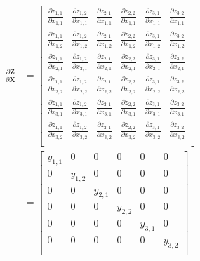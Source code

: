 \documentclass{article}
\newcommand{\matr}[1]{\mathbf{#1}} %
\begin{document}
\begin{align}
\frac{\partial \matr{Z}}{\partial \matr{X}} &=
\begin{bmatrix}
\frac{\partial z_{1,1}}{\partial x_{1,1}} & \frac{\partial z_{1,2}}{\partial x_{1,1}} & \frac{\partial z_{2,1}}{\partial x_{1,1}} & \frac{\partial z_{2,2}}{\partial x_{1,1}} & \frac{\partial z_{3,1}}{\partial x_{1,1}} & \frac{\partial z_{3,2}}{\partial x_{1,1}}\\[0.7em]
\frac{\partial z_{1,1}}{\partial x_{1,2}} & \frac{\partial z_{1,2}}{\partial x_{1,2}} & \frac{\partial z_{2,1}}{\partial x_{1,2}} & \frac{\partial z_{2,2}}{\partial x_{1,2}} & \frac{\partial z_{3,1}}{\partial x_{1,2}} & \frac{\partial z_{3,2}}{\partial x_{1,2}}\\[0.7em]
\frac{\partial z_{1,1}}{\partial x_{2,1}} & \frac{\partial z_{1,2}}{\partial x_{2,1}} & \frac{\partial z_{2,1}}{\partial x_{2,1}} & \frac{\partial z_{2,2}}{\partial x_{2,1}} & \frac{\partial z_{3,1}}{\partial x_{2,1}} & \frac{\partial z_{3,2}}{\partial x_{2,1}}\\[0.7em]
\frac{\partial z_{1,1}}{\partial x_{2,2}} & \frac{\partial z_{1,2}}{\partial x_{2,2}} & \frac{\partial z_{2,1}}{\partial x_{2,2}} & \frac{\partial z_{2,2}}{\partial x_{2,2}} & \frac{\partial z_{3,1}}{\partial x_{2,2}} & \frac{\partial z_{3,2}}{\partial x_{2,2}}\\[0.7em]
\frac{\partial z_{1,1}}{\partial x_{3,1}} & \frac{\partial z_{1,2}}{\partial x_{3,1}} & \frac{\partial z_{2,1}}{\partial x_{3,1}} & \frac{\partial z_{2,2}}{\partial x_{3,1}} & \frac{\partial z_{3,1}}{\partial x_{3,1}} & \frac{\partial z_{3,2}}{\partial x_{3,1}}\\[0.7em]
\frac{\partial z_{1,1}}{\partial x_{3,2}} & \frac{\partial z_{1,2}}{\partial x_{3,2}} & \frac{\partial z_{2,1}}{\partial x_{3,2}} & \frac{\partial z_{2,2}}{\partial x_{3,2}} & \frac{\partial z_{3,1}}{\partial x_{3,2}} & \frac{\partial z_{3,2}}{\partial x_{3,2}}\\[0.7em]
\end{bmatrix} \nonumber
\\ \label{dZbydX_hadamard_product}
&=
\begin{bmatrix}
y_{1,1} & 0 & 0 & 0 & 0 & 0 \\[0.5em]
0 & y_{1,2} & 0 & 0 & 0 & 0 \\[0.5em]
0 & 0 & y_{2,1} & 0 & 0 & 0 \\[0.5em]
0 & 0 & 0 & y_{2,2} & 0 & 0 \\[0.5em]
0 & 0 & 0 & 0 & y_{3,1} & 0 \\[0.5em]
0 & 0 & 0 & 0 & 0 & y_{3,2} \\[0.5em]
\end{bmatrix}
\end{align}
\end{document}
